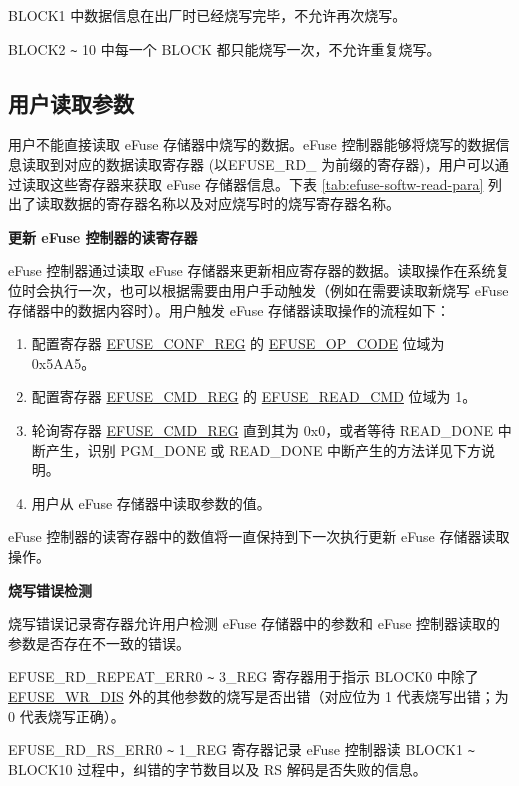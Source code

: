 \documentclass[main\_\_CN.tex]{subfiles}
\begin{document}
BLOCK1 中数据信息在出厂时已经烧写完毕，不允许再次烧写。

BLOCK2 \verb+~+ 10 中每一个 BLOCK 都只能烧写一次，不允许重复烧写。

\subsection{用户读取参数}
\label{sec:efuse-software-read-para}


用户不能直接读取 eFuse 存储器中烧写的数据。eFuse 控制器能够将烧写的数据信息读取到对应的数据读取寄存器 (以EFUSE\_RD\_ 为前缀的寄存器)，用户可以通过读取这些寄存器来获取 eFuse 存储器信息。下表 \ref{tab:efuse-softw-read-para} 列出了读取数据的寄存器名称以及对应烧写时的烧写寄存器名称。



{\bfseries 更新 eFuse 控制器的读寄存器}
\label{sec:efuse-update-reg}

eFuse 控制器通过读取 eFuse 存储器来更新相应寄存器的数据。读取操作在系统复位时会执行一次，也可以根据需要由用户手动触发（例如在需要读取新烧写 eFuse 存储器中的数据内容时）。用户触发 eFuse 存储器读取操作的流程如下：


\begin{enumerate}
    \item 配置寄存器 \hyperref[regdesc:EFUSECONFREG]{EFUSE\_CONF\_REG} 的 \hyperref[fielddesc:EFUSEOPCODE]{EFUSE\_OP\_CODE} 位域为 0x5AA5。
    \item 配置寄存器 \hyperref[regdesc:EFUSECMDREG]{EFUSE\_CMD\_REG} 的 \hyperref[fielddesc:EFUSEREADCMD]{EFUSE\_READ\_CMD} 位域为 1。
    \item 轮询寄存器 \hyperref[regdesc:EFUSECMDREG]{EFUSE\_CMD\_REG} 直到其为 0x0，或者等待 READ\_DONE 中断产生，识别 PGM\_DONE 或 READ\_DONE 中断产生的方法详见下方说明。
    \item 用户从 eFuse 存储器中读取参数的值。
\end{enumerate}
eFuse 控制器的读寄存器中的数值将一直保持到下一次执行更新 eFuse 存储器读取操作。

{\bfseries 烧写错误检测}

烧写错误记录寄存器允许用户检测 eFuse 存储器中的参数和 eFuse 控制器读取的参数是否存在不一致的错误。

EFUSE\_RD\_REPEAT\_ERR0 \verb+~+ 3\_REG 寄存器用于指示 BLOCK0 中除了 \hyperref[fielddesc:EFUSEWRDIS]{EFUSE\_WR\_DIS} 外的其他参数的烧写是否出错（对应位为 1 代表烧写出错；为 0 代表烧写正确）。

EFUSE\_RD\_RS\_ERR0 \verb+~+ 1\_REG 寄存器记录 eFuse 控制器读 BLOCK1 \verb+~+ BLOCK10 过程中，纠错的字节数目以及 RS 解码是否失败的信息。
\end{document}
